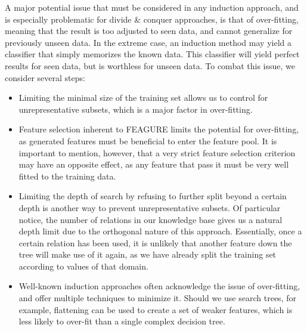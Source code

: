 \documentclass[twoside,11pt]{article}
\theoremstyle{definition}
\begin{document}
A major potential issue that must be considered in any induction approach, and is especially problematic for divide \& conquer approaches, is that of over-fitting, meaning that the result is too adjusted to seen data, and cannot generalize for previously unseen data. In the extreme case, an induction method may yield a classifier that simply memorizes the known data. This classifier will yield perfect results for seen data, but is worthless for unseen data.
To combat this issue, we consider several steps:
\begin{itemize}
	\item Limiting the minimal size of the training set allows us to control for unrepresentative subsets, which is a major factor in over-fitting.
	\item Feature selection inherent to FEAGURE limits the potential for over-fitting, as generated features must be beneficial to enter the feature pool. It is important to mention, however, that a very strict feature selection criterion may have an opposite effect, as any feature that pass it must be very well fitted to the training data.
	\item Limiting the depth of search by refusing to further split beyond a certain depth is another way to prevent unrepresentative subsets. Of particular notice, the number of relations in our knowledge base gives us a natural depth limit due to the orthogonal nature of this approach. Essentially, once a certain relation has been used, it is unlikely that another feature down the tree will make use of it again, as we have already split the training set according to values of that domain. 
	\item Well-known induction approaches often acknowledge the issue of over-fitting, and offer multiple techniques to minimize it. Should we use search trees, for example, flattening can be used to create a set of weaker features, which is less likely to over-fit than a single complex decision tree.
\end{itemize}
\end{document}
